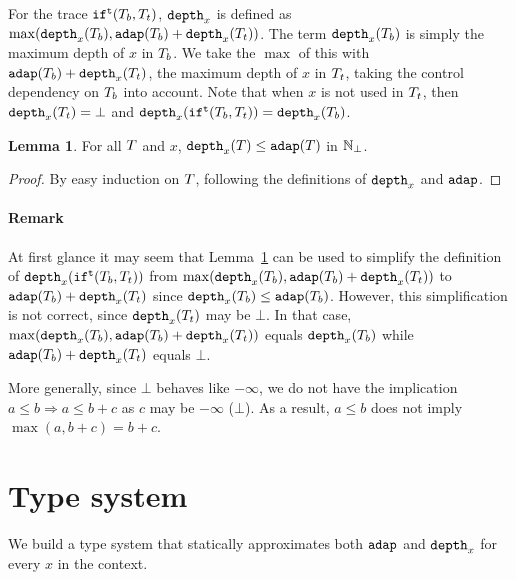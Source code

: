 \documentclass[a4paper,11pt]{article}
\theoremstyle{definition}
\newtheorem{lem}[thm]{Lemma}
\begin{document}
For the trace $\mathtt{if}^{\mathtt{t}}(T_b, T_t)$, $\mathtt{depth}_{x}$ is defined as
$\max(\mathtt{depth}_{x}(T_b), \mathtt{adap}(T_b) + \mathtt{depth}_{x}(T_t))$. The term
$\mathtt{depth}_{x}(T_b)$ is simply the maximum depth of $x$ in $T_b$. We
take the $\max$ of this with $\mathtt{adap}(T_b) + \mathtt{depth}_{x}(T_t)$, the
maximum depth of $x$ in $T_t$, taking the control dependency on
$T_b$ into account. Note that when $x$ is not used in $T_t$, then
$\mathtt{depth}_{x}(T_t) = \bot$ and $\mathtt{depth}_{x}(\mathtt{if}^{\mathtt{t}}(T_b, T_t)) =
\mathtt{depth}_{x}(T_b)$.

\begin{lem}\label{lem:ddep-leq-adap}
For all $T$ and $x$, $\mathtt{depth}_{x}(T) \leq \mathtt{adap}(T)$ in $\mathbb{N}_{\bot}$.
\end{lem}
%
\begin{proof}
By easy induction on $T$, following the definitions of $\mathtt{depth}_{x}$
and $\mathtt{adap}$.
\end{proof}

\paragraph{Remark}
At first glance it may seem that Lemma~\ref{lem:ddep-leq-adap} can be
used to simplify the definition of $\mathtt{depth}_{x}(\mathtt{if}^{\mathtt{t}}(T_b, T_t))$
from $\max(\mathtt{depth}_{x}(T_b), \mathtt{adap}(T_b) + \mathtt{depth}_{x}(T_t))$ to
$\mathtt{adap}(T_b) + \mathtt{depth}_{x}(T_t)$ since $\mathtt{depth}_{x}(T_b) \leq
\mathtt{adap}(T_b)$. However, this simplification is not correct, since
$\mathtt{depth}_{x}(T_t)$ may be $\bot$. In that case, $\max(\mathtt{depth}_{x}(T_b),
\mathtt{adap}(T_b) + \mathtt{depth}_{x}(T_t))$ equals $\mathtt{depth}_{x}(T_b)$ while
$\mathtt{adap}(T_b) + \mathtt{depth}_{x}(T_t)$ equals $\bot$.

More generally, since $\bot$ behaves like $-\infty$, we do not have
the implication $a \leq b \Rightarrow a \leq b + c$ as $c$ may be
$-\infty$ ($\bot$). As a result, $a \leq b$ does not imply $\max(a, b
+ c) = b + c$.





\section{Type system}

We build a type system that statically approximates both $\mathtt{adap}$ and
$\mathtt{depth}_{x}$ for every $x$ in the context.
\end{document}
